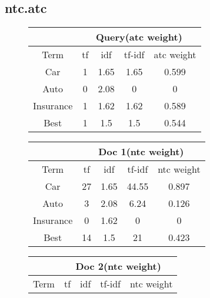 \documentclass[11pt]{article}
\begin{document}
\subsection*{ntc.atc}
\begin{figure}[H]
  \begin{minipage}{0.5\linewidth}
    \begin{table}[H]
      \centering
      \begin{tabular}{|c|c|c|c|c|} \hline
        & \multicolumn{4}{|c|}{Query(atc weight)}\\ \hline
        Term         & tf& idf  & tf-idf & atc weight \\ \hline
        Car          & 1 & 1.65 & 1.65& 0.599 \\ \hline
        Auto         & 0 & 2.08 & 0   & 0\\ \hline
        Insurance    & 1 & 1.62 & 1.62& 0.589\\ \hline
        Best         & 1 & 1.5  & 1.5 & 0.544\\ \hline
      \end{tabular}
    \end{table}
  \end{minipage}
  \begin{minipage}{0.5\linewidth}
    \begin{table}[H]
      \centering
      \begin{tabular}{|c|c|c|c|c|} \hline
        & \multicolumn{4}{|c|}{Doc 1(ntc weight)}\\ \hline
        Term     & tf & idf & tf-idf & ntc weight \\ \hline
        Car      & 27 &1.65& 44.55& 0.897 \\ \hline
        Auto     & 3  &2.08& 6.24 & 0.126\\ \hline
        Insurance& 0  &1.62& 0    & 0\\ \hline
        Best     & 14 &1.5 & 21   & 0.423\\ \hline
      \end{tabular}
    \end{table}
  \end{minipage}
  \begin{minipage}{0.5\linewidth}
    \begin{table}[H]
      \centering
      \begin{tabular}{|c|c|c|c|c|} \hline
        & \multicolumn{4}{|c|}{Doc 2(ntc weight)}\\ \hline
        Term     & tf & idf & tf-idf & ntc weight \\ \hline

\end{tabular}
\end{table}
\end{minipage}
\end{figure}
\end{document}
